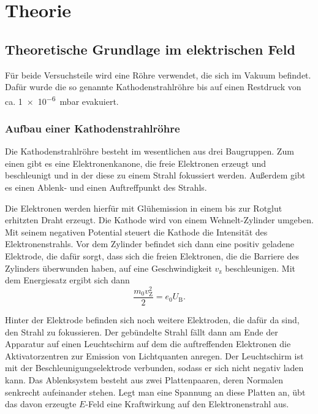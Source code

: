 \section{Theorie}
\label{sec:Theorie}

\subsection{Theoretische Grundlage im elektrischen Feld}

Für beide Versuchsteile wird eine Röhre verwendet, die sich im Vakuum befindet. Dafür wurde die so genannte Kathodenstrahlröhre bis auf einen Restdruck von ca. \SI{1e-6}{\milli\bar} evakuiert. 

\subsubsection{Aufbau einer Kathodenstrahlröhre}

Die Kathodenstrahlröhre besteht im wesentlichen aus drei Baugruppen. Zum einen gibt es eine Elektronenkanone, die freie Elektronen erzeugt und beschleunigt und in der diese zu einem Strahl fokussiert werden. Außerdem gibt es einen Ablenk- und einen Auftreffpunkt des Strahls. 

Die Elektronen werden hierfür mit Glühemission in einem bis zur Rotglut erhitzten Draht erzeugt. 
Die Kathode wird von einem Wehnelt-Zylinder umgeben. Mit seinem negativen Potential steuert die Kathode die Intensität des Elektronenstrahls. 
Vor dem Zylinder befindet sich dann eine positiv geladene Elektrode, die dafür sorgt, dass sich die freien Elektronen, die die Barriere des Zylinders überwunden haben, auf eine Geschwindigkeit $v_\text{z}$ beschleunigen. 
Mit dem Energiesatz ergibt sich dann 
\begin{equation}
    \frac{m_0 v_\text{Z}^2}{2} = e_\text{0} U_\text{B}.
    \label{eqn:energie}
\end{equation}

Hinter der Elektrode befinden sich noch weitere Elektroden, die dafür da sind, den Strahl zu fokussieren. Der gebündelte Strahl fällt dann am Ende der Apparatur auf einen Leuchtschirm auf dem die auftreffenden Elektronen die Aktivatorzentren zur Emission von Lichtquanten anregen. 
Der Leuchtschirm ist mit der Beschleunigungselektrode verbunden, sodass er sich nicht negativ laden kann.
Das Ablenksystem besteht aus zwei Plattenpaaren, deren Normalen senkrecht aufeinander stehen. Legt man eine Spannung an diese Platten an, übt das davon erzeugte $E$-Feld eine Kraftwirkung auf den Elektronenstrahl aus. 

